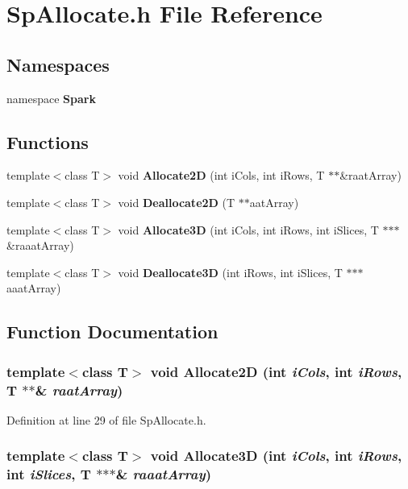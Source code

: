 \section{Sp\-Allocate.h File Reference}
\label{SpAllocate_8h}
\subsection*{Namespaces}
\begin{CompactItemize}
\item 
namespace {\bf Spark}
\end{CompactItemize}
\subsection*{Functions}
\begin{CompactItemize}
\item 
template$<$class T$>$ void {\bf Allocate2D} (int i\-Cols, int i\-Rows, T $\ast$$\ast$\&raat\-Array)
\item 
template$<$class T$>$ void {\bf Deallocate2D} (T $\ast$$\ast$aat\-Array)
\item 
template$<$class T$>$ void {\bf Allocate3D} (int i\-Cols, int i\-Rows, int i\-Slices, T $\ast$$\ast$$\ast$\&raaat\-Array)
\item 
template$<$class T$>$ void {\bf Deallocate3D} (int i\-Rows, int i\-Slices, T $\ast$$\ast$$\ast$aaat\-Array)
\end{CompactItemize}


\subsection{Function Documentation}
\subsubsection{\setlength{\rightskip}{0pt plus 5cm}template$<$class T$>$ void Allocate2D (int {\em i\-Cols}, int {\em i\-Rows}, T $\ast$$\ast$\& {\em raat\-Array})}\label{namespaceSpark_a32}


Definition at line 29 of file Sp\-Allocate.h.
\subsubsection{\setlength{\rightskip}{0pt plus 5cm}template$<$class T$>$ void Allocate3D (int {\em i\-Cols}, int {\em i\-Rows}, int {\em i\-Slices}, T $\ast$$\ast$$\ast$\& {\em raaat\-Array})}\label{namespaceSpark_a34}


